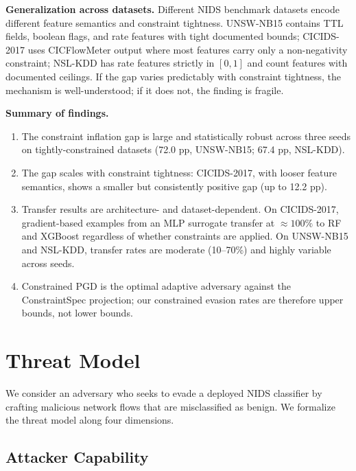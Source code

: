 \documentclass[sigconf,anonymous=true]{acmart}
\begin{document}
\noindent\textbf{Generalization across datasets.}
Different NIDS benchmark datasets encode different feature semantics
and constraint tightness.  UNSW-NB15 contains TTL fields, boolean
flags, and rate features with tight documented bounds; CICIDS-2017 uses
CICFlowMeter output where most features carry only a non-negativity
constraint; NSL-KDD has rate features strictly in $[0,1]$ and count
features with documented ceilings.  If the gap varies predictably with
constraint tightness, the mechanism is well-understood; if it does not,
the finding is fragile.

\noindent\textbf{Summary of findings.}
\begin{enumerate}
  \item The constraint inflation gap is large and statistically robust
        across three seeds on tightly-constrained datasets (72.0 pp,
        UNSW-NB15; 67.4 pp, NSL-KDD).
  \item The gap scales with constraint tightness: CICIDS-2017, with
        looser feature semantics, shows a smaller but consistently
        positive gap (up to 12.2 pp).
  \item Transfer results are architecture- and dataset-dependent.
        On CICIDS-2017, gradient-based examples from an MLP surrogate
        transfer at $\approx 100\%$ to RF and XGBoost regardless of
        whether constraints are applied.  On UNSW-NB15 and NSL-KDD,
        transfer rates are moderate (10--70\%) and highly variable
        across seeds.
  \item Constrained PGD is the optimal adaptive adversary against the
        ConstraintSpec projection; our constrained evasion rates are
        therefore upper bounds, not lower bounds.
\end{enumerate}

\section{Threat Model}
\label{sec:threat}

We consider an adversary who seeks to evade a deployed NIDS classifier
by crafting malicious network flows that are misclassified as benign.
We formalize the threat model along four dimensions.

\subsection{Attacker Capability}
\end{document}
